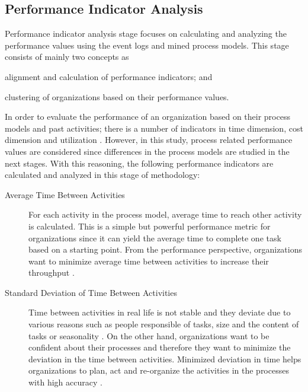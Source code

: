 \subsection{Performance Indicator Analysis}
\label{subsec:performance-indicator-analysis}
Performance indicator analysis stage focuses on calculating and analyzing the performance values using the event logs and mined process models. This stage consists of mainly two concepts as 
\begin{inparaenum}
\item alignment and calculation of performance indicators; and
\item clustering of organizations based on their performance values.
\end{inparaenum}
In order to evaluate the performance of an organization based on their process models and past activities; there is a number of indicators in time dimension, cost dimension and utilization \cite{van2011process}. However, in this study, process related performance values are considered since differences in the process models are studied in the next stages. With this reasoning, the following performance indicators are calculated and analyzed in this stage of methodology:
\begin{description}
	\item[Average Time Between Activities] For each activity in the process model, average time to reach other activity is calculated. This is a simple but powerful performance metric for organizations since it can yield the average time to complete one task based on a starting point. From the performance perspective, organizations want to minimize average time between activities to increase their throughput \cite{van2012replaying}.
	\item[Standard Deviation of Time Between Activities] Time between activities in real life is not stable and they deviate due to various reasons such as people responsible of tasks, size and the content of tasks or seasonality \cite{van2011process}. On the other hand, organizations want to be confident about their processes and therefore they want to minimize the deviation in the time between activities. Minimized deviation in time helps organizations to plan, act and re-organize the activities in the processes with high accuracy \cite{van2012replaying}. 
\end{description}


